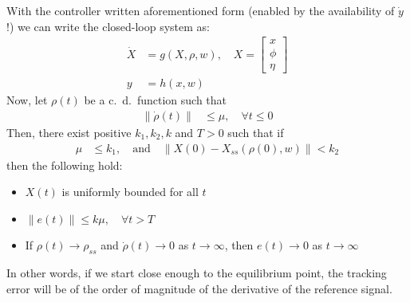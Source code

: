 With the controller written aforementioned form (enabled by the availability of $\dot{y}$!) we can write the closed-loop system as:
\begin{align*}
    \dot{X} & = g(X, \rho, w), \quad X = \begin{bmatrix} x \\ \phi \\ \eta \end{bmatrix} \\
    y       & = h(x,w)
\end{align*}
\newpar{}
Now, let $\rho(t)$ be a c.\ d.\ function such that
\begin{align*}
    \| \dot{\rho}(t) \| & \leq \mu, \quad \forall t \leq 0
\end{align*}
Then, there exist positive $ k_1, k_2, k $ and $ T > 0 $ such that if
\begin{align*}
    \mu & \leq k_1, \quad \text{and} \quad \| X(0) - X_{ss}(\rho(0), w) \| < k_2
\end{align*}
then the following hold:
\begin{itemize}
    \item $ X(t)$ is uniformly bounded for all $ t $
    \item $ \| e(t) \| \leq k \mu, \quad \forall t > T $
    \item If $ \rho(t) \to \rho_{ss} $ and $ \dot{\rho}(t) \to 0 $ as $ t \to \infty $, then $ e(t) \to 0 $ as $ t \to \infty $
\end{itemize}
In other words, if we start close enough to the equilibrium point, the tracking error will be of the order of magnitude of the derivative of the reference signal.



